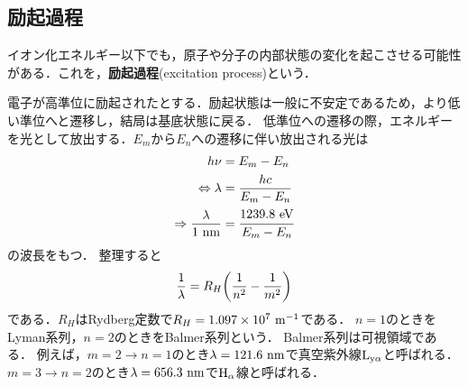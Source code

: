 \documentclass{report}
\begin{document}
    \subsection{励起過程}
      イオン化エネルギー以下でも，原子や分子の内部状態の変化を起こさせる可能性がある．これを，\textbf{励起過程}(excitation process)という．
      \par
      電子が高準位に励起されたとする．励起状態は一般に不安定であるため，より低い準位へと遷移し，結局は基底状態に戻る．
      低準位への遷移の際，エネルギーを光として放出する．$E_m$から$E_n$への遷移に伴い放出される光は
      \begin{align}
        h\nu &= E_m - E_n\\
        \Leftrightarrow \lambda &= \frac{hc}{E_m - E_n} \\ 
        \Rightarrow \frac{\lambda}{1\ \r{nm}} &= \cfrac{1239.8\ \r{eV}}{E_m - E_n}
      \end{align}
      の波長をもつ．
      整理すると
      \begin{align}
        \frac{1}{\lambda} = R_H \qty(\frac{1}{n^2} - \frac{1}{m^2})
      \end{align}
      である．$R_H$はRydberg定数で$R_H = 1.097 \times 10^7\ \mathrm{m^{-1}}$である．
      $n = 1$のときをLyman系列，$n = 2$のときをBalmer系列という．
      Balmer系列は可視領域である．
      例えば，$m = 2 \to n = 1$のとき$\lambda = 121.6\ \mathrm{nm}$で真空紫外線$\mathrm{L}_{\mathrm{y}\alpha}$と呼ばれる．
      $m = 3 \to n = 2$のとき$\lambda = 656.3\ \mathrm{nm}$で$\mathrm{H}_{\alpha}$線と呼ばれる．
\end{document}
